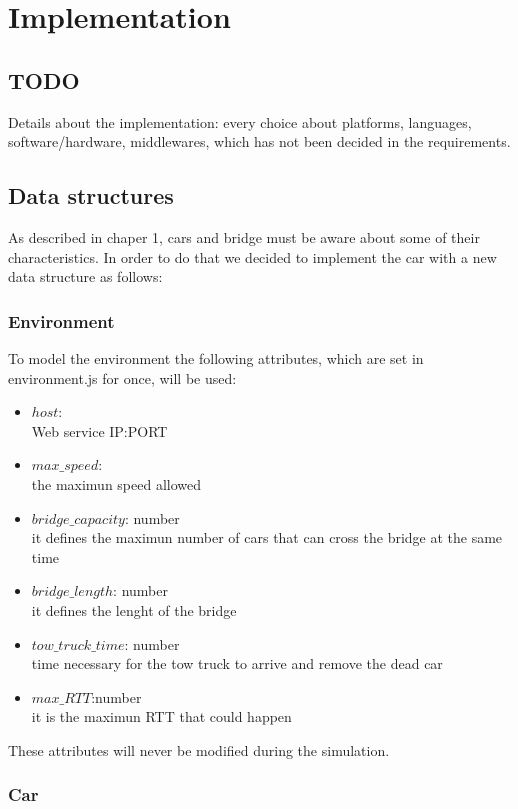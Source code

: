 \chapter{Implementation}\label{ch:implementation}

\section{TODO}
Details about the implementation: every choice about platforms, languages, software/hardware, middlewares, which has not been decided in the requirements.

\section{Data structures}
As described in chaper 1, cars and bridge must be aware about some of their characteristics.
In order to do that we decided to implement the car with a new data structure as follows:

\subsection{Environment}

To model the environment the following attributes, which are set in environment.js for once, will be used:
\begin{itemize}
    \item $host$:\\ Web service IP:PORT
    \item $max\_speed$:\\ the maximun speed allowed
    \item $bridge\_capacity$: number\\ it defines the maximun number of cars that can cross the bridge
    at the same time
    \item $bridge\_length$: number\\ it defines the lenght of the bridge
    \item $tow\_truck\_time$: number\\ time necessary for the tow truck to arrive and remove the dead car
    \item $max\_RTT$:number\\ it is the maximun RTT that could happen
\end{itemize}

These attributes will never be modified during the simulation.

\subsection{Car}

